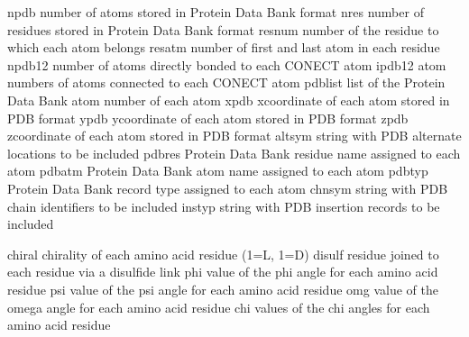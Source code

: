 \documentclass[letterpaper,11pt,english]{sphinxmanual}
\begin{document}
\begin{sphinxVerbatim}[commandchars=\\\{\}]
npdb            number of atoms stored in Protein Data Bank format
nres            number of residues stored in Protein Data Bank format
resnum          number of the residue to which each atom belongs
resatm          number of first and last atom in each residue
npdb12          number of atoms directly bonded to each CONECT atom
ipdb12          atom numbers of atoms connected to each CONECT atom
pdblist         list of the Protein Data Bank atom number of each atom
xpdb            x\PYGZhy{}coordinate of each atom stored in PDB format
ypdb            y\PYGZhy{}coordinate of each atom stored in PDB format
zpdb            z\PYGZhy{}coordinate of each atom stored in PDB format
altsym          string with PDB alternate locations to be included
pdbres          Protein Data Bank residue name assigned to each atom
pdbatm          Protein Data Bank atom name assigned to each atom
pdbtyp          Protein Data Bank record type assigned to each atom
chnsym          string with PDB chain identifiers to be included
instyp          string with PDB insertion records to be included
\end{sphinxVerbatim}


\begin{sphinxVerbatim}[commandchars=\\\{\}]
chiral          chirality of each amino acid residue (1=L, \PYGZhy{}1=D)
disulf          residue joined to each residue via a disulfide link
phi             value of the phi angle for each amino acid residue
psi             value of the psi angle for each amino acid residue
omg             value of the omega angle for each amino acid residue
chi             values of the chi angles for each amino acid residue
\end{sphinxVerbatim}

\end{document}
